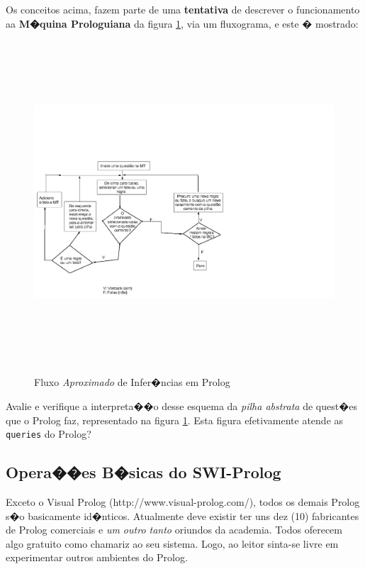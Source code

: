 \documentclass[final,a4paper]{article}
\begin{document}
\newpage
Os conceitos acima, fazem parte de uma {\bf tentativa} de
descrever o funcionamento aa {\bf M�quina Prologuiana}
 da figura \ref{fig_ciclo_prolog}, via um fluxograma, e este � mostrado: 

\begin{figure}[!htb]
\centering
\includegraphics[height=12cm, width=13cm]{figuras/ciclo_prolog.pdf}
\label{fig_ciclo_prolog}
\caption{Fluxo {\em Aproximado} de Infer�ncias em Prolog}
\end{figure}

 Avalie e  verifique  a interpreta��o desse esquema 
da {\em pilha abstrata} de quest�es que o Prolog faz, 
representado na figura \ref{fig_ciclo_prolog}. Esta figura efetivamente atende 
as \texttt{queries} do Prolog?


\newpage
\subsection{Opera��es B�sicas do SWI-Prolog}

Exceto o Visual Prolog (http://www.visual-prolog.com/), todos os demais Prolog
s�o basicamente id�nticos. Atualmente deve existir ter uns dez (10)
fabricantes de Prolog comerciais e \emph{um outro tanto} 
oriundos da academia. Todos oferecem algo gratuito como chamariz ao seu sistema. Logo, ao leitor sinta-se livre em experimentar outros ambientes do Prolog.
\end{document}

